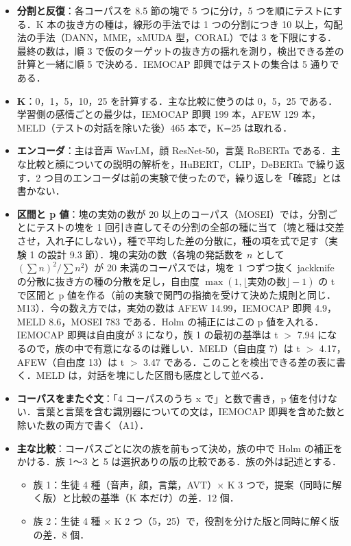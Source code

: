 \documentclass[11pt,a4paper]{ltjsarticle}
\begin{document}
\begin{itemize}
  \item \textbf{分割と反復}：各コーパスを 8.5 節の塊で 5 つに分け，5 つを順にテストにする．K 本の抜き方の種は，線形の手法では 1 つの分割につき 10 以上，勾配法の手法（DANN，MME，xMUDA 型，CORAL）では 3 を下限にする．最終の数は，順 3 で仮のターゲットの抜き方の揺れを測り，検出できる差の計算と一緒に順 5 で決める．IEMOCAP 即興ではテストの集合は 5 通りである．
  \item \textbf{K}：0，1，5，10，25 を計算する．主な比較に使うのは 0，5，25 である．学習側の感情ごとの最少は，IEMOCAP 即興 199 本，AFEW 129 本，MELD（テストの対話を除いた後）465 本で，K=25 は取れる．
  \item \textbf{エンコーダ}：主は音声 WavLM，顔 ResNet-50，言葉 RoBERTa である．主な比較と顔についての説明の解析を，HuBERT，CLIP，DeBERTa で繰り返す．2 つ目のエンコーダは前の実験で使ったので，繰り返しを「確認」とは書かない．
  \item \textbf{区間と p 値}：塊の実効の数が 20 以上のコーパス（MOSEI）では，分割ごとにテストの塊を 1 回引き直してその分割の全部の種に当て（塊と種は交差させ，入れ子にしない），種で平均した差の分散に，種の項を式で足す（実験 1 の設計 9.3 節）．塊の実効の数（各塊の発話数を $n$ として $(\sum n)^2/\sum n^2$）が 20 未満のコーパスでは，塊を 1 つずつ抜く jackknife の分散に抜き方の種の分散を足し，自由度 $\max(1, \lfloor \mbox{実効の数} \rfloor - 1)$ の t で区間と p 値を作る（前の実験で関門の指摘を受けて決めた規則と同じ．M13）．今の数え方では，実効の数は AFEW 14.99，IEMOCAP 即興 4.9，MELD 8.6，MOSEI 783 である．Holm の補正にはこの p 値を入れる．IEMOCAP 即興は自由度が 3 になり，族 1 の最初の基準は t $>$ 7.94 になるので，族の中で有意になるのは難しい．MELD（自由度 7）は t $>$ 4.17，AFEW（自由度 13）は t $>$ 3.47 である．このことを検出できる差の表に書く．MELD は，対話を塊にした区間も感度として並べる．
  \item \textbf{コーパスをまたぐ文}：「4 コーパスのうち x で」と数で書き，p 値を付けない．言葉と言葉を含む識別器についての文は，IEMOCAP 即興を含めた数と除いた数の両方で書く（A1）．
  \item \textbf{主な比較}：コーパスごとに次の族を前もって決め，族の中で Holm の補正をかける．族 1〜3 と 5 は選択ありの版の比較である．族の外は記述とする．
  \begin{itemize}
    \item 族 1：生徒 4 種（音声，顔，言葉，AVT）× K 3 つで，提案（同時に解く版）と比較の基準（K 本だけ）の差．12 個．
    \item 族 2：生徒 4 種 × K 2 つ（5，25）で，役割を分けた版と同時に解く版の差．8 個．

\end{itemize}
\end{itemize}
\end{document}
